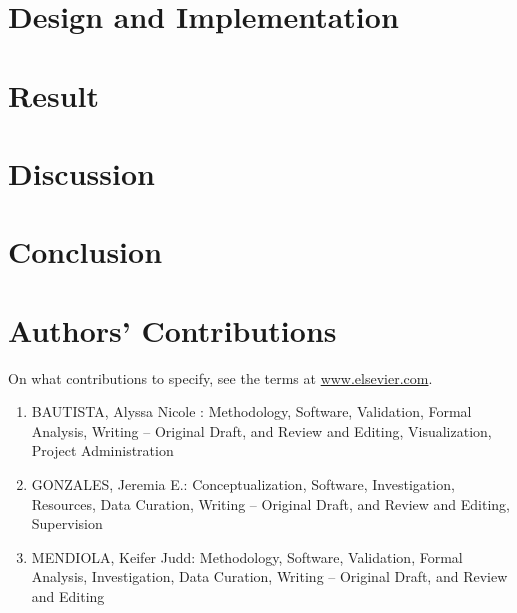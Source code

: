 \section{Design and Implementation}
\label{sec:design}


\section{Result}
\label{sec:result}


\section{Discussion}
\label{sec:discussion}


\section{Conclusion}
\label{sec:conclusion}


\section*{Authors' Contributions}
On what contributions to specify, see the terms at \url{www.elsevier.com}.
\begin{enumerate}
    \item BAUTISTA, Alyssa Nicole : Methodology, Software, Validation, Formal Analysis, Writing – Original Draft, and Review and Editing, Visualization, Project Administration
    \item GONZALES, Jeremia E.: Conceptualization, Software, Investigation, Resources, Data Curation, Writing – Original Draft, and Review and Editing, Supervision
    \item MENDIOLA, Keifer Judd: Methodology, Software, Validation, Formal Analysis, Investigation, Data Curation, Writing – Original Draft, and Review and Editing
\end{enumerate}





% 

